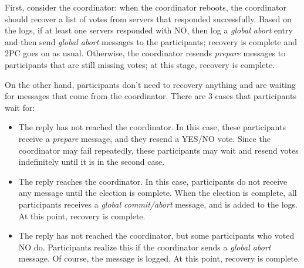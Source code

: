 First, consider the coordinator:
when the coordinator reboots, the coordinator should recover a list of votes from servers that responded successfully.
Based on the logs, if at least one servers responded with NO, then log a \emph{global abort} entry and then send \emph{global abort} messages to the participants; recovery is complete and 2PC goes on as usual.
Otherwise, the coordinator resends \emph{prepare} messages to participants that are still missing votes; at this stage, recovery is complete.

On the other hand, participants don't need to recovery anything and are waiting for messages that come from the coordinator.
There are 3 cases that participants wait for:
\begin{itemize}
\item
The reply has not reached the coordinator.
In this case, these participants receive a \emph{prepare} message, and they resend a YES/NO vote.
Since the coordinator may fail repeatedly, these participants may wait and resend votes indefinitely until it is in the second case.
\item
The reply reaches the coordinator.
In this case, participants do not receive any message until the election is complete.
When the election is complete, all participants receives a \emph{global commit/abort} message, and is added to the logs.
At this point, recovery is complete.
\item
The reply has not reached the coordinator, but some participants who voted NO do.
Participants realize this if the coordinator sends a \emph{global abort} message.
Of course, the message is logged.
At this point, recovery is complete.
\end{itemize}

